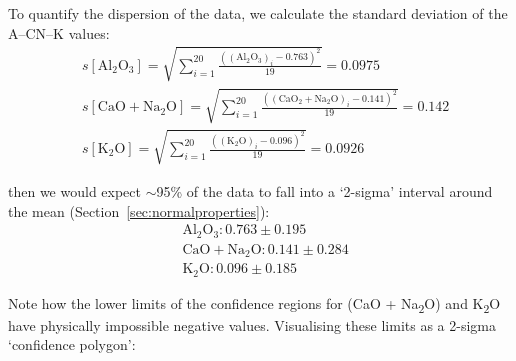 To quantify the dispersion of the data, we calculate the standard
deviation of the A--CN--K values:
\[
\begin{split}
  &s[\mbox{Al}_2\mbox{O}_3] =
  \sqrt{\sum\limits_{i=1}^{20}
    \frac{((\mbox{Al}_2\mbox{O}_3)_i - 0.763)^2}{19}} = 0.0975 \\
  &s[\mbox{CaO} + \mbox{Na}_2\mbox{O}] =
  \sqrt{\sum\limits_{i=1}^{20}
    \frac{((\mbox{CaO}_2+\mbox{Na}_2\mbox{O})_i - 0.141)^2}{19} } = 0.142 \\
  &s[\mbox{K}_2\mbox{O}] =
  \sqrt{\sum\limits_{i=1}^{20}
    \frac{((\mbox{K}_2\mbox{O})_i - 0.096)^2}{19}} = 0.0926
\end{split}
\]

\noindent then we would expect $\sim$95\% of the data to fall into a
`2-sigma' interval around the mean
(Section~\ref{sec:normalproperties}):
\[
\begin{split}
  &\mbox{Al}_2\mbox{O}_3: 0.763 \pm 0.195 \\
  &\mbox{CaO} + \mbox{Na}_2\mbox{O}: 0.141 \pm 0.284 \\
  &\mbox{K}_2\mbox{O}: 0.096 \pm 0.185
\end{split}
\]

Note how the lower limits of the confidence regions for (CaO +
Na\textsubscript{2}O) and K\textsubscript{2}O have physically
impossible negative values. Visualising these limits as a 2-sigma
`confidence polygon':

